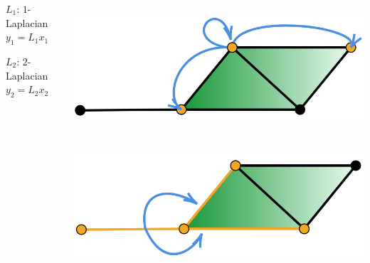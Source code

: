 \documentclass[landscape,a0paper,blockverticalspace = 5mm]{tikzposter}
\begin{document}
\begin{columns}
{{\begin{center}
\begin{minipage}{0.2\linewidth}
      \end{minipage}\hspace{4.5cm}
      \begin{minipage}{0.2\linewidth}
         \begin{center}
		  $L_1$: $1$-Laplacian\\
		$y_1=L_1x_1$
	\end{center}
      \end{minipage} \hspace{4.5cm}
	\begin{minipage}{0.2\linewidth}
         \begin{center}
		 $L_2$: $2$-Laplacian\\
		$y_2=L_2x_2$
	\end{center}
      \end{minipage}

      \end{center}

\begin{center}

		 \begin{minipage}{0.2\linewidth}
		 \begin{center}

          \includegraphics[height=4.8cm]{figures/glap0.png}

          \vspace{1.2cm}

          \end{center}
      \end{minipage} \hspace{3.6cm}
      \begin{minipage}{0.2\linewidth}
      \begin{center}
     	\vspace{1.5cm}
          \includegraphics[height=4.58cm]{figures/glap1.png}


\end{center}
\end{minipage}
\end{center}}}
\end{columns}
\end{document}
